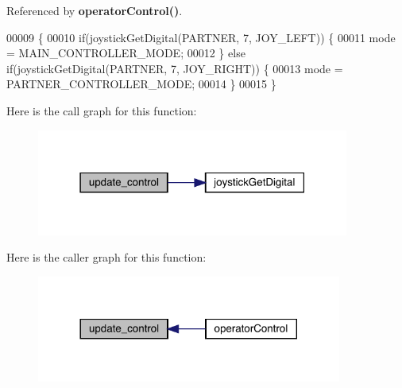 Referenced by \textbf{ operator\+Control()}.


\begin{DoxyCode}
00009                       \{
00010   \textcolor{keywordflow}{if}(joystickGetDigital(PARTNER, 7, JOY_LEFT)) \{
00011     mode = MAIN_CONTROLLER_MODE;
00012   \} \textcolor{keywordflow}{else} \textcolor{keywordflow}{if}(joystickGetDigital(PARTNER, 7, JOY_RIGHT)) \{
00013     mode = PARTNER_CONTROLLER_MODE;
00014   \}
00015 \}
\end{DoxyCode}
Here is the call graph for this function\+:\nopagebreak
\begin{figure}[H]
\begin{center}
\leavevmode
\includegraphics[width=291pt]{partner_8h_ab2c78903a76d2ed8969271803c78368a_cgraph}
\end{center}
\end{figure}
Here is the caller graph for this function\+:\nopagebreak
\begin{figure}[H]
\begin{center}
\leavevmode
\includegraphics[width=284pt]{partner_8h_ab2c78903a76d2ed8969271803c78368a_icgraph}
\end{center}
\end{figure}
